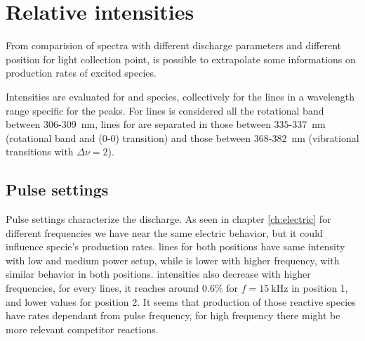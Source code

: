 \section{Relative intensities}
From comparision of spectra with different discharge parameters and different position for light collection point, is possible to extrapolate some informations on production rates of excited species.

Intensities are evaluated for  and  species, collectively for the lines in a wavelength range specific for the peaks. For  lines is considered all the rotational band between $\num{306}$-\SI{309}{\nano\meter}, lines for  are separated in those between $\num{335}$-\SI{337}{\nano\meter} (rotational band and (0-0) transition) and those between $\num{368}$-\SI{382}{\nano\meter} (vibrational transitions with $\Delta \nu = 2$).

\subsection{Pulse settings}
Pulse settings characterize the discharge. As seen in chapter \ref{ch:electric} for different frequencies we have near the same electric behavior, but it could influence specie's production rates.  lines for both positions have same intensity with low and medium power setup, while is lower with higher frequency, with similar behavior in both positions.  intensities also decrease with higher frequencies, for every lines, it reaches around $0.6\%$ for $f = \SI{15}{\kilo\hertz}$ in position 1, and lower values for position 2.
It seems that production of those reactive species have rates dependant from pulse frequency, for high frequency there might be more relevant competitor reactions.

